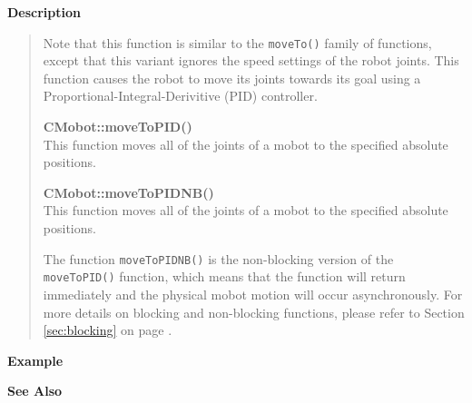 {\bf Description}\\
\vspace{-12pt}
\begin{quote}
Note that this function is similar to the \texttt{moveTo()} family of functions, except
that this variant ignores the speed settings of the robot joints. This function causes
the robot to move its joints towards its goal using a Proportional-Integral-Derivitive (PID)
controller.

{\bf CMobot::moveToPID()}\\
This function moves all of the joints of a mobot to the specified absolute positions. 

{\bf CMobot::moveToPIDNB()}\\
This function moves all of the joints of a mobot to the specified absolute positions. 

The function \texttt{moveToPIDNB()} is the non-blocking version of
the \texttt{moveToPID()} function, which means that the function will return
immediately and the physical mobot motion will occur asynchronously. For
more details on blocking and non-blocking functions, please refer to 
Section \ref{sec:blocking} on page \pageref{sec:blocking}.\\
\end{quote}

\noindent
{\bf Example}\\
\noindent

\noindent
{\bf See Also}\\

